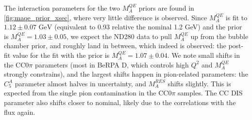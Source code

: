 The interaction parameters for the two $M_A^{QE}$ priors are found in \autoref{fig:maqe_prior_xsec}, where very little difference is observed. Since $M_A^{QE}$ is fit to $1.12\pm0.07\text{ GeV}$ (equivalent to 0.93 relative the nominal 1.2 GeV) and the prior is $M_A^{QE}=1.03\pm0.05$, we expect the ND280 data to pull $M_A^{QE}$ up from the bubble chamber prior, and roughly land in between, which indeed is observed: the post-fit value for the fit with the prior is $M_A^{QE}=1.07\pm0.04$. We note small shifts in the CC0$\pi$ parameters (most in BeRPA D, which controls high $Q^2$ and $M_A^{QE}$ strongly constrains), and the largest shifts happen in pion-related parameters: the $C_5^A$ parameter almost halves in uncertainty, and $M_A^{RES}$ shifts slightly. This is expected from the single pion contamination in the CC0$\pi$ samples. The CC DIS parameter also shifts closer to nominal, likely due to the correlations with the flux again.
